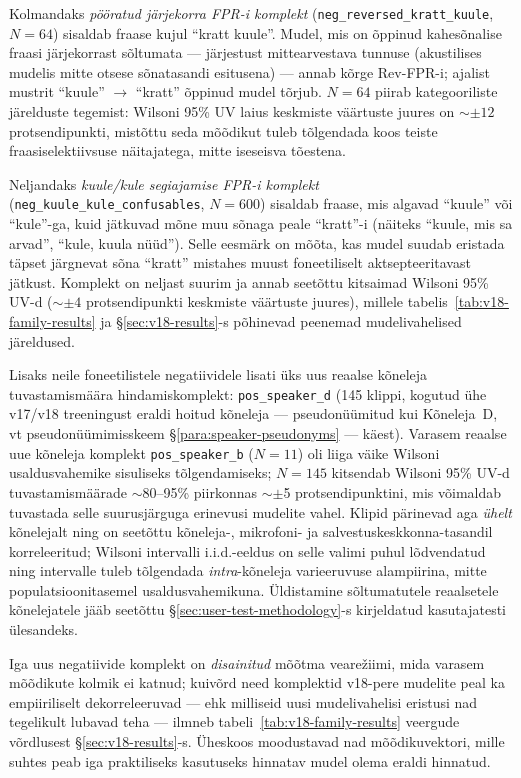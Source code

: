 Kolmandaks \emph{pööratud järjekorra FPR-i komplekt} (\texttt{neg\_reversed\_kratt\_kuule}, $N=64$) sisaldab fraase kujul \enquote{kratt kuule}. Mudel, mis on õppinud kahesõnalise fraasi järjekorrast sõltumata --- järjestust mittearvestava tunnuse (akustilises mudelis mitte otsese sõnatasandi esitusena) --- annab kõrge Rev-FPR-i; ajalist mustrit \enquote{kuule} $\rightarrow$ \enquote{kratt} õppinud mudel tõrjub. $N=64$ piirab kategooriliste järelduste tegemist: Wilsoni 95\% UV laius keskmiste väärtuste juures on ${\sim}\pm12$ protsendipunkti, mistõttu seda mõõdikut tuleb tõlgendada koos teiste fraasiselektiivsuse näitajatega, mitte iseseisva tõestena.

Neljandaks \emph{kuule/kule segiajamise FPR-i komplekt} (\texttt{neg\_kuule\_kule\_confusables}, $N=600$) sisaldab fraase, mis algavad \enquote{kuule} või \enquote{kule}-ga, kuid jätkuvad mõne muu sõnaga peale \enquote{kratt}-i (näiteks \enquote{kuule, mis sa arvad}, \enquote{kule, kuula nüüd}). Selle eesmärk on mõõta, kas mudel suudab eristada täpset järgnevat sõna \enquote{kratt} mistahes muust foneetiliselt aktsepteeritavast jätkust. Komplekt on neljast suurim ja annab seetõttu kitsaimad Wilsoni 95\% UV-d (${\sim}\pm4$ protsendipunkti keskmiste väärtuste juures), millele tabelis~\ref{tab:v18-family-results} ja §\ref{sec:v18-results}-s põhinevad peenemad mudelivahelised järeldused.

Lisaks neile foneetilistele negatiividele lisati üks uus reaalse kõneleja tuvastamismäära hindamiskomplekt: \texttt{pos\_speaker\_d} (145 klippi, kogutud ühe v17/v18 treeningust eraldi hoitud kõneleja --- pseudonüümitud kui Kõneleja~D, vt pseudonüümimisskeem §\ref{para:speaker-pseudonyms} --- käest). Varasem reaalse uue kõneleja komplekt \texttt{pos\_speaker\_b} ($N=11$) oli liiga väike Wilsoni usaldusvahemike sisuliseks tõlgendamiseks; $N=145$ kitsendab Wilsoni 95\% UV-d tuvastamismäärade $\sim$80--95\% piirkonnas ${\sim}\pm$5 protsendipunktini, mis võimaldab tuvastada selle suurusjärguga erinevusi mudelite vahel. Klipid pärinevad aga \emph{ühelt} kõnelejalt ning on seetõttu kõneleja-, mikrofoni- ja salvestuskeskkonna-tasandil korreleeritud; Wilsoni intervalli i.i.d.-eeldus on selle valimi puhul lõdvendatud ning intervalle tuleb tõlgendada \emph{intra}-kõneleja varieeruvuse alampiirina, mitte populatsioonitasemel usaldusvahemikuna. Üldistamine sõltumatutele reaalsetele kõnelejatele jääb seetõttu §\ref{sec:user-test-methodology}-s kirjeldatud kasutajatesti ülesandeks.

Iga uus negatiivide komplekt on \emph{disainitud} mõõtma vearežiimi, mida varasem mõõdikute kolmik ei katnud; kuivõrd need komplektid v18-pere mudelite peal ka empiiriliselt dekorreleeruvad --- ehk milliseid uusi mudelivahelisi eristusi nad tegelikult lubavad teha --- ilmneb tabeli~\ref{tab:v18-family-results} veergude võrdlusest §\ref{sec:v18-results}-s. Üheskoos moodustavad nad mõõdiku\-vektori, mille suhtes peab iga praktiliseks kasutuseks hinnatav mudel olema eraldi hinnatud.

